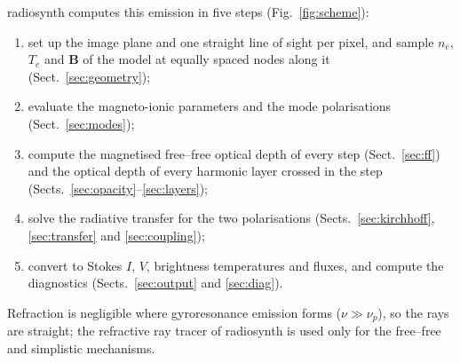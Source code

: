 \documentclass[11pt,a4paper]{article}
\newcommand{\vect}[1]{\bm{#1}}
\begin{document}
\textsf{radiosynth} computes this emission in five steps (Fig.~\ref{fig:scheme}):
\begin{enumerate}
  \item set up the image plane and one straight line of sight per pixel, and sample
        $n_e$, $T_e$ and $\vect B$ of the model at equally spaced nodes along it
        (Sect.~\ref{sec:geometry});
  \item evaluate the magneto-ionic parameters and the mode polarisations
        (Sect.~\ref{sec:modes});
  \item compute the magnetised free--free optical depth of every step
        (Sect.~\ref{sec:ff}) and the optical depth of every harmonic layer crossed in the
        step (Sects.~\ref{sec:opacity}--\ref{sec:layers});
  \item solve the radiative transfer for the two polarisations
        (Sects.~\ref{sec:kirchhoff}, \ref{sec:transfer} and \ref{sec:coupling});
  \item convert to Stokes $I$, $V$, brightness temperatures and fluxes, and compute the
        diagnostics (Sects.~\ref{sec:output} and \ref{sec:diag}).
\end{enumerate}
Refraction is negligible where gyroresonance emission forms ($\nu\gg\nu_p$), so the rays
are straight; the refractive ray tracer of \textsf{radiosynth} is used only for the
free--free and simplistic mechanisms.
\end{document}
